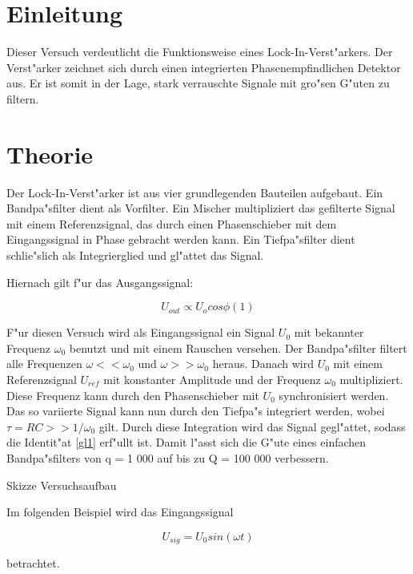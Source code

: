 \documentclass{scrartcl}
\begin{document}
\section{Einleitung}

Dieser Versuch verdeutlicht die Funktionsweise eines Lock-In-Verst"arkers.
Der Verst"arker zeichnet sich durch einen integrierten Phasenempfindlichen Detektor aus.
Er ist somit in der Lage, stark verrauschte Signale mit gro"sen G"uten zu filtern.


\section{Theorie}

Der Lock-In-Verst"arker ist aus vier grundlegenden Bauteilen aufgebaut.
Ein Bandpa"sfilter dient als Vorfilter. Ein Mischer multipliziert das gefilterte Signal mit einem Referenzsignal,
das durch einen Phasenschieber mit dem Eingangssignal in Phase gebracht werden kann.
Ein Tiefpa"sfilter dient schlie"slich als Integrierglied und gl"attet das Signal.

Hiernach gilt f"ur das Ausgangssignal:

\begin{equation}
\label{gl1}
U_{out} \propto U_o cos \phi (1)
\end{equation}

F"ur diesen Versuch wird als Eingangssignal ein Signal $U_0$ mit bekannter Frequenz $\omega_0$ benutzt und mit einem Rauschen versehen.
Der Bandpa"sfilter filtert alle Frequenzen $\omega << \omega_0$ und $\omega >> \omega_0$ heraus.
Danach wird $U_0$ mit einem Referenzsignal $U_{ref}$ mit konstanter Amplitude und der Frequenz $\omega_0$ multipliziert.
Diese Frequenz kann durch den Phasenschieber mit $U_0$ synchronisiert werden. Das so variierte Signal kann nun durch den Tiefpa"s integriert werden,
wobei $\tau = RC >> 1/\omega_0$ gilt.
Durch diese Integration wird das Signal gegl"attet, sodass die Identit"at \ref{gl1} erf"ullt ist.
Damit l"asst sich die G"ute eines einfachen Bandpa"sfilters von q = 1 000 auf bis zu Q = 100 000 verbessern.

Skizze Versuchsaufbau

Im folgenden Beispiel wird das Eingangssignal

\begin{displaymath}
U_{sig} = U_0 sin(\omega t) \nonumber
\end{displaymath}

betrachtet.
\end{document}
